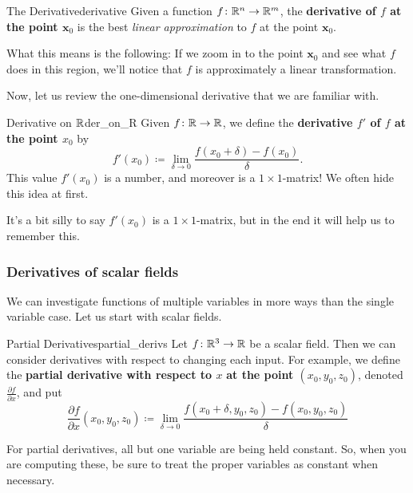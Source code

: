         \begin{df}{The Derivative}{derivative}
        Given a function $f\colon \mathbb{R}^n \to \mathbb{R}^m$, the \textbf{derivative of $f$ at the point $\mathbf{x}_0$} is the best \emph{linear approximation} to $f$ at the point $\mathbf{x}_0$.
        
        What this means is the following: If we zoom in to the point $\mathbf{x}_0$ and see what $f$ does in this region, we'll notice that $f$ is approximately a linear transformation.
        \end{df}
        
        Now, let us review the one-dimensional derivative that we are familiar with.
        
        \begin{df}{Derivative on $\mathbb{R}$}{der_on_R}
        Given $f\colon \mathbb{R} \to \mathbb{R}$, we define the \textbf{derivative $f'$ of $f$ at the point $x_0$} by
        \[
        f'(x_0)\coloneqq \lim_{\delta \to 0} \frac{f(x_0+\delta)-f(x_0)}{\delta}.
        \]
        This value $f'(x_0)$ is a number, and moreover is a $1\times 1$-matrix!  We often hide this idea at first.
        \end{df}
        
        It's a bit silly to say $f'(x_0)$ is a $1\times 1$-matrix, but in the end it will help us to remember this.
        
        \subsubsection{Derivatives of scalar fields}
        We can investigate functions of multiple variables in more ways than the single variable case.  Let us start with scalar fields.
        
        \begin{df}{Partial Derivatives}{partial_derivs}
        Let $f\colon \mathbb{R}^3 \to \mathbb{R}$ be a scalar field.  Then we can consider derivatives with respect to changing each input.  For example, we define the \textbf{partial derivative with respect to $x$} \textbf{at the point $(x_0,y_0,z_0)$}, denoted $\frac{\partial f}{\partial x}$, and put
        \[
        \frac{\partial f}{\partial x}(x_0,y_0,z_0)\coloneqq \lim_{\delta \to 0} \frac{f(x_0+\delta,y_0,z_0)-f(x_0,y_0,z_0)}{\delta}
        \]
        \end{df}
        
        \begin{remark}
        For partial derivatives, all but one variable are being held constant.  So, when you are computing these, be sure to treat the proper variables as constant when necessary.
        \end{remark}
        
